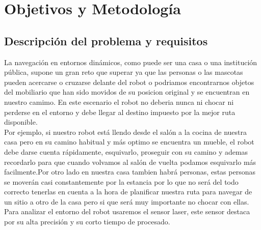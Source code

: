 \chapter{Objetivos y Metodología}
\label{cap:objetivos}


\section{Descripción del problema y requisitos}
\label{sec:descripciondelproblema}

La navegación en entornos dinámicos, como puede ser una casa o una institución pública, supone un gran reto que superar ya que las personas o las mascotas pueden acercarse o cruzarse delante del robot o podriamos encontrarnos objetos del mobiliario que han sido movidos de su posicion original y se encuentran en nuestro camimo. En este escenario el robot no deberia nunca ni chocar ni perderse en el entorno y debe llegar al destino impuesto por la mejor ruta disponible.\\

Por ejemplo, si nuestro robot está llendo desde el salón a la cocina de nuestra casa pero en su camino habitual y más optimo se encuentra un mueble, el robot debe darse cuenta rápidamente, esquivarlo, proseguir con su camino y ademas recordarlo para que cuando volvamos al salón de vuelta podamos esquivarlo más facilmente.Por otro lado en nuestra casa tambien habrá personas, estas personas se moverán casi constantemente por la estancia por lo que no será del todo correcto tenerlas en cuenta a la hora de planificar nuestra ruta para navegar de un sitio a otro de la casa pero si que será muy importante no chocar con ellas.\\

Para analizar el entorno del robot usaremos el sensor laser, este sensor destaca por su alta precisión y su corto tiempo de procesado.\\


